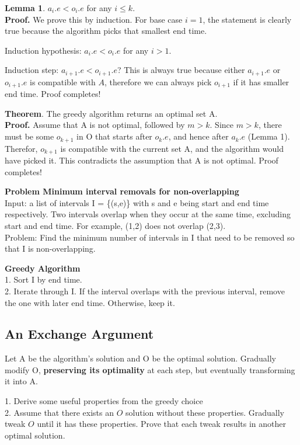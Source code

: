\documentclass[12pt,article]{article}
\newenvironment{problem}[2][Problem]
    { \begin{mdframed}[backgroundcolor=gray!20] \textbf{#1 #2} \\}
    {  \end{mdframed}}
\begin{document}
\textbf{Lemma 1}. $a_i.e < o_i.e$ for any $i \leq k$.\\
\textbf{Proof.} We prove this by induction. For base case $i = 1$, the statement is clearly true because the algorithm picks that smallest end time.

Induction hypothesis: $a_i.e < o_i.e$ for any $i > 1$.

Induction step: $a_{i+1}.e < o_{i+1}.e$? This is always true because either $a_{i+1}.e$ or $o_{i+1}.e$ is compatible with $A$, therefore we can always pick $o_{i+1}$ if it has smaller end time. Proof completes!

\textbf{Theorem}. The greedy algorithm returns an optimal set A.\\
\textbf{Proof.} Assume that A is not optimal, followed by $m > k$. Since $m > k$, there must be some $o_{k+1}$ in O that starts after $o_{k}.e$, and hence after $a_{k}.e$ (Lemma 1). Therefor, $o_{k+1}$ is compatible with the current set A, and the algorithm would have picked it. This contradicts the assumption that A is not optimal. Proof completes!

\begin{problem}{Minimum interval removals for non-overlapping} 
Input: a list of intervals I = \{(s,e)\} with s and e being start and end time respectively. Two intervals overlap when they occur at the same time, excluding start and end time. For example, (1,2) does not overlap (2,3). \\

Problem: Find the minimum number of intervals in I that need to be removed so that I is non-overlapping.
\end{problem}

\textbf{Greedy Algorithm}\\
1. Sort I by end time.\\
2. Iterate through I. If the interval overlaps with the previous interval, remove the one with later end time. Otherwise, keep it. \\

\newpage
\subsection{An Exchange Argument}
Let A be the algorithm's solution and O be the optimal solution. Gradually modify O, \textbf{preserving its optimality} at each step, but eventually transforming it into A.

1. Derive some useful properties from the greedy choice \\
2. Assume that there exists an $O$ solution without these properties. Gradually tweak $O$ until it has these properties. Prove that each tweak results in another optimal solution.
\end{document}
